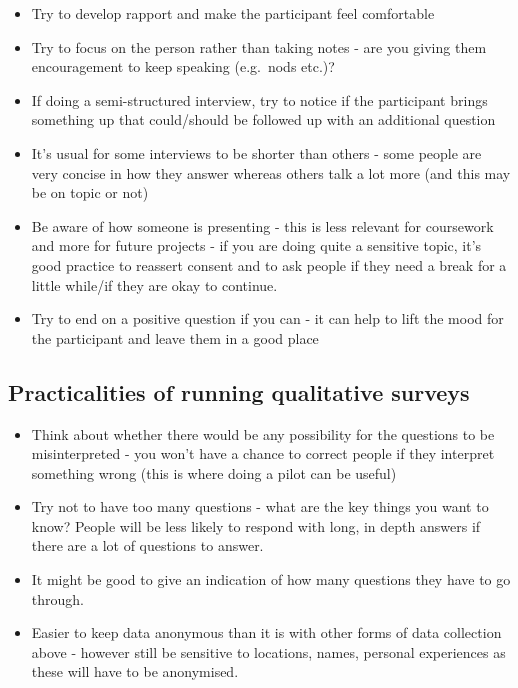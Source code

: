 \documentclass[
  english,
  letterpaper,
  DIV=11,
  numbers=noendperiod]{scrreprt}
\providecommand{\tightlist}{%
  \setlength{\itemsep}{0pt}\setlength{\parskip}{0pt}}
\begin{document}
\begin{itemize}
\tightlist
\item
  Try to develop rapport and make the participant feel comfortable
\item
  Try to focus on the person rather than taking notes - are you giving
  them encouragement to keep speaking (e.g.~nods etc.)?
\item
  If doing a semi-structured interview, try to notice if the participant
  brings something up that could/should be followed up with an
  additional question
\item
  It's usual for some interviews to be shorter than others - some people
  are very concise in how they answer whereas others talk a lot more
  (and this may be on topic or not)
\item
  Be aware of how someone is presenting - this is less relevant for
  coursework and more for future projects - if you are doing quite a
  sensitive topic, it's good practice to reassert consent and to ask
  people if they need a break for a little while/if they are okay to
  continue.
\item
  Try to end on a positive question if you can - it can help to lift the
  mood for the participant and leave them in a good place
\end{itemize}

\subsection{Practicalities of running qualitative
surveys}\label{practicalities-of-running-qualitative-surveys}

\begin{itemize}
\tightlist
\item
  Think about whether there would be any possibility for the questions
  to be misinterpreted - you won't have a chance to correct people if
  they interpret something wrong (this is where doing a pilot can be
  useful)
\item
  Try not to have too many questions - what are the key things you want
  to know? People will be less likely to respond with long, in depth
  answers if there are a lot of questions to answer.
\item
  It might be good to give an indication of how many questions they have
  to go through.
\item
  Easier to keep data anonymous than it is with other forms of data
  collection above - however still be sensitive to locations, names,
  personal experiences as these will have to be anonymised.
\end{itemize}
\end{document}
